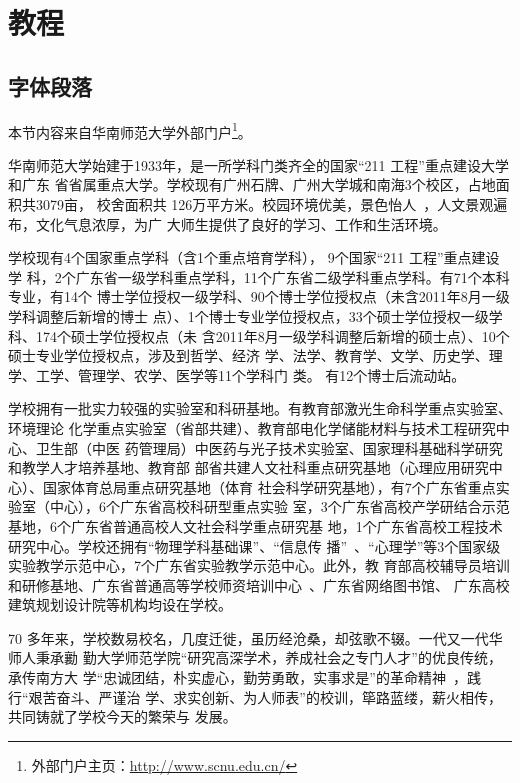 \chapter{教程}

\section{字体段落}
\label{sec:font}

本节内容来自华南师范大学外部门户\footnote{外部门户主页：\url{http://www.scnu.edu.cn/}}。

华南师范大学始建于1933年，是一所学科门类齐全的国家“211 工程”重点建设大学和广东%
省省属重点大学。学校现有广州石牌、广州大学城和南海3个校区，占地面积共3079亩，%
校舍面积共 126万平方米。校园环境优美，景色怡人~，人文景观遍布，文化气息浓厚，为广%
大师生提供了良好的学习、工作和生活环境。

学校现有4个国家重点学科（含1个重点培育学科）， 9个国家“211 工程”重点建设学%
科，2个广东省一级学科重点学科，11个广东省二级学科重点学科。有71个本科专业，有14个%
博士学位授权一级学科、90个博士学位授权点（未含2011年8月一级学科调整后新增的博士%
点）、1个博士专业学位授权点，33个硕士学位授权一级学科、174个硕士学位授权点（未%
含2011年8月一级学科调整后新增的硕士点）、10个硕士专业学位授权点，涉及到哲学、经济%
学、法学、教育学、文学、历史学、理学、工学、管理学、农学、医学等11个学科门%
类。 有12个博士后流动站。

学校拥有一批实力较强的实验室和科研基地。有教育部激光生命科学重点实验室、环境理论
化学重点实验室（省部共建）、教育部电化学储能材料与技术工程研究中心、卫生部（中医
药管理局）中医药与光子技术实验室、国家理科基础科学研究和教学人才培养基地、教育部
部省共建人文社科重点研究基地（心理应用研究中心）、国家体育总局重点研究基地（体育
社会科学研究基地），有7个广东省重点实验室（中心），6个广东省高校科研型重点实验
室，3个广东省高校产学研结合示范基地，6个广东省普通高校人文社会科学重点研究基
地，1个广东省高校工程技术研究中心。学校还拥有“物理学科基础课”、“信息传
播”~、“心理学”等3个国家级实验教学示范中心，7个广东省实验教学示范中心。此外，教
育部高校辅导员培训和研修基地、广东省普通高等学校师资培训中心~、广东省网络图书馆、
广东高校建筑规划设计院等机构均设在学校。

70 多年来，学校数易校名，几度迁徙，虽历经沧桑，却弦歌不辍。一代又一代华师人秉承勷
勤大学师范学院{\kai “研究高深学术，养成社会之专门人才”}的优良传统，承传南方大
学{\kai “忠诚团结，朴实虚心，勤劳勇敢，实事求是”}的革命精神~，践行{\kai “艰苦奋斗、严谨治
学、求实创新、为人师表”}的校训，筚路蓝缕，薪火相传，共同铸就了学校今天的繁荣与
发展。

